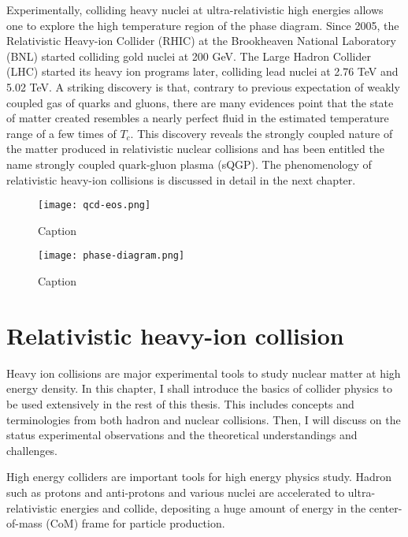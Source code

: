 Experimentally, colliding heavy nuclei at ultra-relativistic high energies allows one to explore the high temperature region of the phase diagram.
Since 2005, the Relativistic Heavy-ion Collider (RHIC) at the Brookheaven National Laboratory (BNL) started colliding gold nuclei at 200 GeV. 
The Large Hadron Collider (LHC) started its heavy ion programs later, colliding lead nuclei at 2.76 TeV and 5.02 TeV.
A striking discovery is that, contrary to previous expectation of weakly coupled gas of quarks and gluons, there are many evidences point that the state of matter created resembles a nearly perfect fluid in the estimated temperature range of a few times of $T_c$.
This discovery reveals the strongly coupled nature of the matter produced in relativistic nuclear collisions and has been entitled the name strongly coupled quark-gluon plasma (sQGP).
The phenomenology of relativistic heavy-ion collisions is discussed in detail in the next chapter.

\begin{figure}
    \centering
    \texttt{[image: qcd-eos.png]}
    \caption{Caption}
    \label{fig:qcd_eos}
\end{figure}

\begin{figure}
    \centering
    \texttt{[image: phase-diagram.png]}
    \caption{Caption}
    \label{fig:phase-diagram}
\end{figure}


\section{Relativistic heavy-ion collision}
Heavy ion collisions are major experimental tools to study nuclear matter at high energy density.
In this chapter, I shall introduce the basics of collider physics to be used extensively in the rest of this thesis. 
This includes concepts and terminologies from both hadron and nuclear collisions. 
Then, I will discuss on the status experimental observations and the theoretical understandings and challenges.

High energy colliders are important tools for high energy physics study. 
Hadron such as protons and anti-protons and various nuclei are accelerated to ultra-relativistic energies and collide, depositing a huge amount of energy in the center-of-mass (CoM) frame for particle production.

